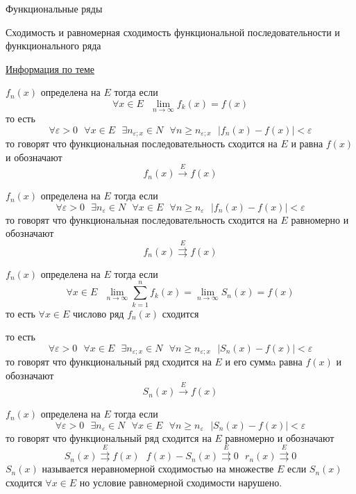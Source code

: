 \begin{title}
  Функциональные ряды
\end{title}

\begin{title}[\Large]
  Сходимость и равномерная сходимость функциональной последовательности и
  функционального ряда
\end{title}

\href{http://nuclphys.sinp.msu.ru/mathan/p3/m3102.html}{Информация по теме}

\begin{define}
  $f_n(x)$ определена на $E$ тогда если
  $$
  \forall x \in E ~~~ \lim_{n \to \infty} f_k(x) = f(x)
  $$
  то есть
  $$
  \forall \varepsilon > 0 ~~~ \forall x \in E ~~~ \exists n_{\varepsilon; x}
  \in N ~~~ \forall n \ge n_{\varepsilon; x} ~~~ \left| f_n(x) - f(x) \right|
  < \varepsilon
  $$
  то говорят что функциональная последовательность сходится на $E$ и равна
  $f(x)$ и обозначают
  $$
  f_n(x) \stackrel{E}{\to} f(x)
  $$
\end{define}

\begin{define}
  $f_n(x)$ определена на $E$ тогда если
  $$
  \forall \varepsilon > 0 ~~~ \exists n_{\varepsilon} \in N ~~~ \forall x \in E
  ~~~ \forall n \ge n_{\varepsilon} ~~~ |f_n (x) - f(x)| < \varepsilon
  $$
  то говорят что функциональная последовательность сходится на $E$ равномерно и
  обозначают
  $$
  f_n(x) \stackrel{E}{\rightrightarrows} f(x)
  $$
\end{define}

\begin{define}
  $f_n(x)$ определена на $E$ тогда если
  $$
  \forall x \in E ~~~ \lim_{n \to \infty} \sum_{k=1}^n f_k(x) =
  \lim_{n \to \infty} S_n(x) = f(x)
  $$
  то есть $\forall x \in E$ числово ряд $f_n(x)$
  сходится

  то есть
  $$
  \forall \varepsilon > 0 ~~~ \forall x \in E ~~~ \exists n_{\varepsilon; x}
  \in N ~~~ \forall n \ge n_{\varepsilon; x} ~~~ \left| S_n(x) - f(x) \right|
  < \varepsilon
  $$
  то говорят что функциональный ряд сходится на $E$ и его суммa равна $f(x)$ и
  обозначают
  $$
  S_n(x) \stackrel{E}{\to} f(x)
  $$
\end{define}

\begin{define}
  $f_n(x)$ определена на $E$ тогда если
  $$
  \forall \varepsilon > 0 ~~~ \exists n_{\varepsilon} \in N ~~~ \forall x \in E
  ~~~ \forall n \ge n_{\varepsilon} ~~~ |S_n (x) - f(x)| < \varepsilon
  $$
  то говорят что функциональный ряд сходится на $E$ равномерно и обозначают
  $$
  S_n(x) \stackrel{E}{\rightrightarrows} f(x) ~~~
  f(x) - S_n(x) \stackrel{E}{\rightrightarrows} 0 ~~~
  r_n(x) \stackrel{E}{\rightrightarrows} 0
  $$
  $S_n(x)$ называется неравномерной сходимостью на множестве $E$ если $S_n(x)$
  сходится $\forall x \in E$ но условие равномерной сходимости нарушено.
\end{define}

